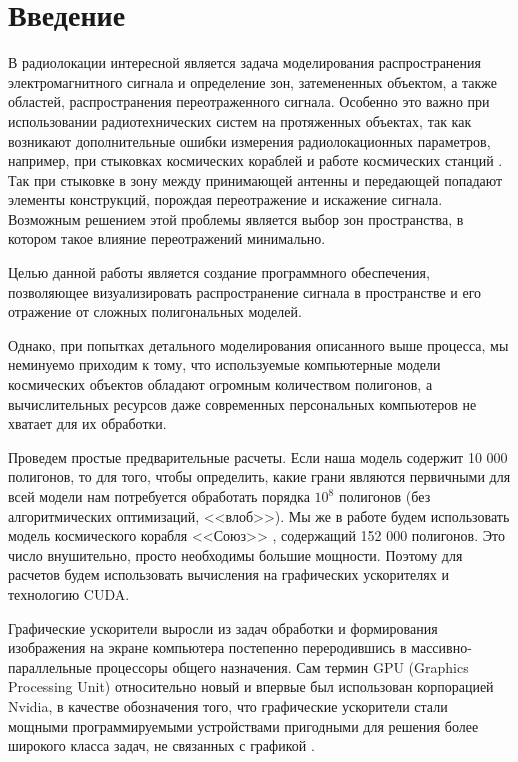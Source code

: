\newpage
\section*{Введение}

В радиолокации интересной является задача моделирования распространения электромагнитного сигнала и определение зон, затемененных объектом, а также областей, распространения переотраженного сигнала. Особенно это важно при использовании радиотехнических систем на протяженных объектах, так как возникают дополнительные ошибки измерения радиолокационных параметров, например, при стыковках космических кораблей и работе космических станций \cite{sazonov}. Так при стыковке в зону между принимающей антенны и передающей попадают элементы конструкций, порождая переотражение и искажение сигнала. Возможным решением этой проблемы является выбор зон пространства, в котором такое влияние переотражений минимально.

Целью данной работы является создание программного обеспечения, позволяющее визуализировать распространение сигнала в пространстве и его отражение от сложных полигональных моделей.

Однако, при попытках детального моделирования описанного выше процесса, мы неминуемо приходим к тому, что используемые компьютерные модели космических объектов обладают огромным количеством полигонов, а вычислительных ресурсов даже современных персональных компьютеров не хватает для их обработки. 

Проведем простые предварительные расчеты. Если наша модель содержит 10 000 полигонов, то для того, чтобы  определить, какие грани являются первичными для всей модели нам потребуется обработать порядка $ 10^8 $ полигонов (без алгоритмических оптимизаций, <<влоб>>). Мы же в работе будем использовать модель космического корабля <<Союз>> \cite{soyz}, содержащий 152 000 полигонов. Это число внушительно, просто необходимы большие мощности. Поэтому для расчетов будем использовать вычисления на графических ускорителях и технологию CUDA. 

Графические ускорители выросли из задач обработки и формирования изображения на экране компьютера постепенно переродившись в массивно-параллельные процессоры общего назначения. Сам термин GPU (Graphics Processing Unit) относительно новый и впервые был использован корпорацией Nvidia, в качестве обозначения того, что графические ускорители стали мощными программируемыми устройствами пригодными для решения более широкого класса задач, не связанных с графикой \cite{boreskov1}.

